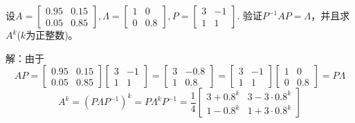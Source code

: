 \begin{eg}
设$A=\begin{bmatrix}0.95&0.15\\0.05&0.85\end{bmatrix},
\Lambda=\begin{bmatrix}1&0\\0&0.8\end{bmatrix},
P=\begin{bmatrix}3&-1\\1&1\end{bmatrix}.$
验证$P^{-1}AP=\Lambda$，并且求$A^k$($k$为正整数)。
\end{eg}
解：由于
\begin{equation*}
AP=\begin{bmatrix}0.95&0.15\\0.05&0.85\end{bmatrix}
\begin{bmatrix}3&-1\\1&1\end{bmatrix}=
\begin{bmatrix}3&-0.8\\1&0.8\end{bmatrix}=
\begin{bmatrix}3&-1\\1&1\end{bmatrix}
\begin{bmatrix}1&0\\0&0.8\end{bmatrix}
=P\Lambda
\end{equation*}
\begin{equation*}
A^k=(P\Lambda P^{-1})^k=P\Lambda^kP^{-1}=\frac{1}{4}
\begin{bmatrix}3+0.8^k&3-3\cdot0.8^k\\1-0.8^k&1+3\cdot0.8^k\end{bmatrix}
\end{equation*}

